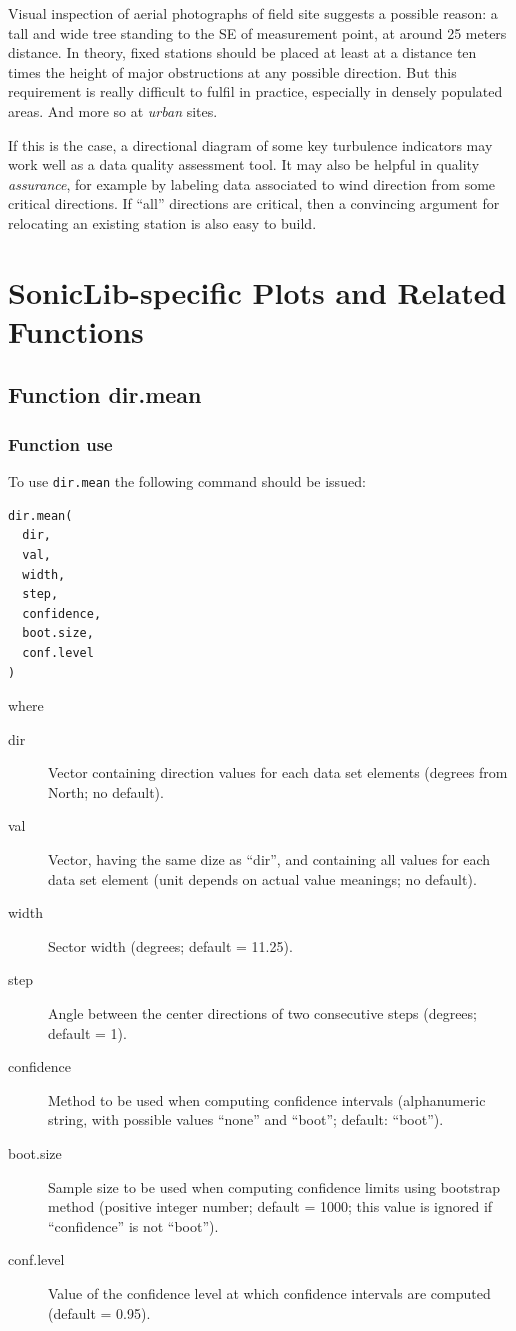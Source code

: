 \documentclass[a4paper,10pt]{book}
\begin{document}
Visual inspection of aerial photographs of field site suggests a possible reason: a tall and wide tree standing to the SE of measurement point, at around 25 meters distance. In theory, fixed stations should be placed at least at a distance ten times the height of major obstructions at any possible direction. But this requirement is really difficult to fulfil in practice, especially in densely populated areas. And more so at \emph{urban} sites. 

If this is the case, a directional diagram of some key turbulence indicators may work well as a data quality assessment tool. It may also be helpful in quality \emph{assurance}, for example by labeling data associated to wind direction from some critical directions. If ``all'' directions are critical, then a convincing argument for relocating an existing station is also easy to build.

\section{SonicLib-specific Plots and Related Functions}

\subsection{Function dir.mean}
\subsubsection{Function use}

To use \verb|dir.mean| the following command should be issued:

\begin{verbatim}
dir.mean(
  dir,
  val,
  width,
  step,
  confidence,
  boot.size,
  conf.level
)
\end{verbatim} 

\noindent where

\begin{description}
 \item[dir] Vector containing direction values for each data set elements (degrees from North; no default).
 \item[val] Vector, having the same dize as ``dir'', and containing all values for each data set element (unit depends on actual value meanings; no default).
 \item[width] Sector width (degrees; default = 11.25).
 \item[step] Angle between the center directions of two consecutive steps (degrees; default = 1).
 \item[confidence] Method to be used when computing confidence intervals (alphanumeric string, with possible values ``none'' and ``boot''; default: ``boot'').
 \item[boot.size] Sample size to be used when computing confidence limits using bootstrap method (positive integer number; default = 1000; this value is ignored if ``confidence'' is not ``boot'').
 \item[conf.level] Value of the confidence level at which confidence intervals are computed (default = 0.95).
\end{description}
\end{document}
